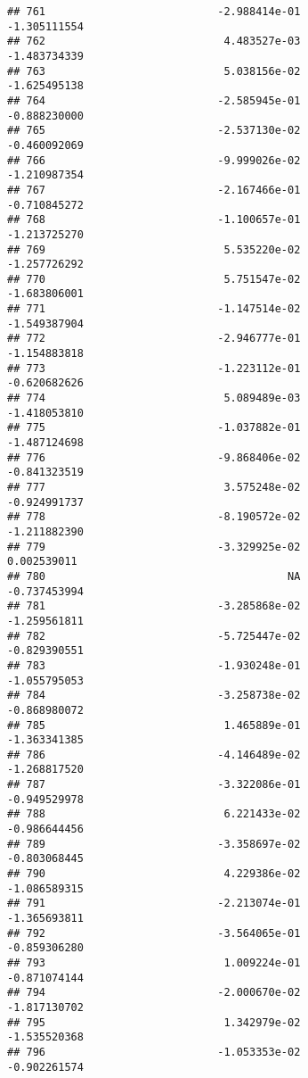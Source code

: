 \documentclass[
]{article}
\begin{document}
\begin{verbatim}
## 761                           -2.988414e-01               -1.305111554
## 762                            4.483527e-03               -1.483734339
## 763                            5.038156e-02               -1.625495138
## 764                           -2.585945e-01               -0.888230000
## 765                           -2.537130e-02               -0.460092069
## 766                           -9.999026e-02               -1.210987354
## 767                           -2.167466e-01               -0.710845272
## 768                           -1.100657e-01               -1.213725270
## 769                            5.535220e-02               -1.257726292
## 770                            5.751547e-02               -1.683806001
## 771                           -1.147514e-02               -1.549387904
## 772                           -2.946777e-01               -1.154883818
## 773                           -1.223112e-01               -0.620682626
## 774                            5.089489e-03               -1.418053810
## 775                           -1.037882e-01               -1.487124698
## 776                           -9.868406e-02               -0.841323519
## 777                            3.575248e-02               -0.924991737
## 778                           -8.190572e-02               -1.211882390
## 779                           -3.329925e-02                0.002539011
## 780                                      NA               -0.737453994
## 781                           -3.285868e-02               -1.259561811
## 782                           -5.725447e-02               -0.829390551
## 783                           -1.930248e-01               -1.055795053
## 784                           -3.258738e-02               -0.868980072
## 785                            1.465889e-01               -1.363341385
## 786                           -4.146489e-02               -1.268817520
## 787                           -3.322086e-01               -0.949529978
## 788                            6.221433e-02               -0.986644456
## 789                           -3.358697e-02               -0.803068445
## 790                            4.229386e-02               -1.086589315
## 791                           -2.213074e-01               -1.365693811
## 792                           -3.564065e-01               -0.859306280
## 793                            1.009224e-01               -0.871074144
## 794                           -2.000670e-02               -1.817130702
## 795                            1.342979e-02               -1.535520368
## 796                           -1.053353e-02               -0.902261574

\end{verbatim}
\end{document}
